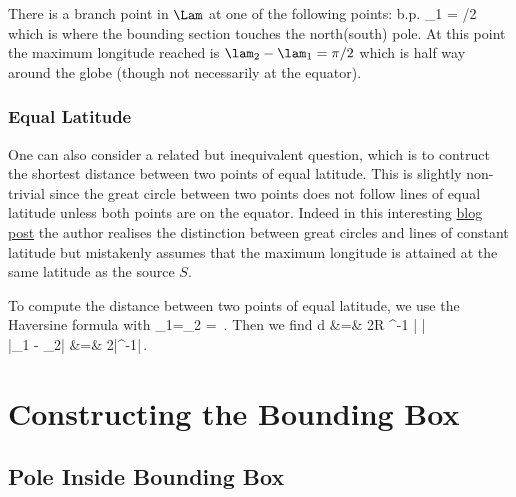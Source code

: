 \documentclass[preprint,12pt]{article}
\begin{document}
There is a branch point  in $\Lam$ at one of the following points:
\be
{\rm b.p.} \quad \vphi_1 \pm {} = \pm \pi/2
\ee
which is where the bounding section touches the north(south) pole. At this point the maximum longitude reached is $\lam_2-\lam_1 = \pi/2$ which is half way around the globe (though not necessarily at the equator).


\subsubsection{Equal  Latitude}

One can also consider a related but inequivalent question, which is to contruct the shortest distance between two points of equal latitude. This is slightly non-trivial since the great circle between two points does not follow lines of equal latitude unless both points are on the equator. Indeed in this interesting \href{http://janmatuschek.de/LatitudeLongitudeBoundingCoordinates}{blog post} the author realises the distinction between great circles and lines of constant latitude but mistakenly assumes that the maximum longitude is attained at the same latitude as the source $S$. 

To compute the distance between two points of equal latitude, we use the Haversine formula with
\be
\vphi_1=\vphi_2 = \vphi\,.
\ee
Then we find
\bea
d &=&  2R \sin^{-1} \Big| \cos \vphi   \sin \Blp {}\Brp \Big|  \\
\Ra \quad |\lam_1 - \lam_2| &=& 2\left|\sin^{-1}\right|\,.
\eea
 


\section{Constructing the Bounding Box}

\subsection{Pole Inside Bounding Box}
\end{document}
